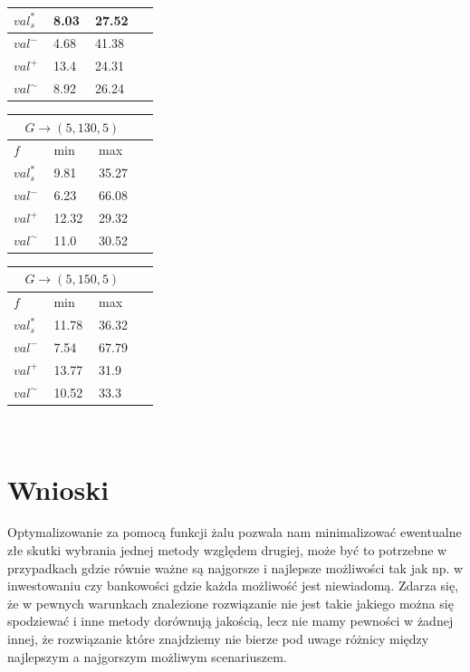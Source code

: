 \documentclass[10pt]{article}
\begin{document}
\begin{center}
\begin{tabular}{|C{0.08\linewidth}|C{0.08\linewidth}|C{0.08\linewidth}|C{0.08\linewidth}|}
    $val^*_s$    & 8.03 & 27.52 \\ \hline
    ${val}^-$    & 4.68 & 41.38 \\ \hline
    ${val}^+$    & 13.4 & 24.31 \\ \hline
    ${val}^\sim$ & 8.92 & 26.24 \\ \hline
  \end{tabular}
  \begin{tabular}{|C{0.08\linewidth}|C{0.08\linewidth}|C{0.08\linewidth}|C{0.08\linewidth}|}
    \hline
     \\ \hline
    $f$          & min  & max  \\ \hline
    $val^*_s$    & 9.81 & 35.27 \\ \hline
    ${val}^-$    & 6.23 & 66.08 \\ \hline
    ${val}^+$    & 12.32 & 29.32 \\ \hline
    ${val}^\sim$ & 11.0 & 30.52 \\ \hline
  \end{tabular}
  \begin{tabular}{|C{0.08\linewidth}|C{0.08\linewidth}|C{0.08\linewidth}|C{0.08\linewidth}|}
    \hline
     \\ \hline
    $f$          & min  & max  \\ \hline
    $val^*_s$    & 11.78 & 36.32  \\ \hline
    ${val}^-$    & 7.54 & 67.79 \\ \hline
    ${val}^+$    & 13.77 & 31.9  \\ \hline
    ${val}^\sim$ & 10.52 & 33.3  \\ \hline
  \end{tabular}
  \\\label{tab:some}
\end{center}

\section{Wnioski}
Optymalizowanie za pomocą funkcji żalu pozwala nam minimalizować ewentualne złe skutki wybrania jednej metody względem drugiej, może być to potrzebne w przypadkach gdzie równie ważne są najgorsze i najlepsze możliwości tak jak np. w inwestowaniu czy bankowości gdzie każda możliwość jest niewiadomą. Zdarza się, że w pewnych warunkach znalezione rozwiązanie nie jest takie jakiego można się spodziewać i inne metody dorównują jakością, lecz nie mamy pewności w żadnej innej, że rozwiązanie które znajdziemy nie bierze pod uwage różnicy między najlepszym a najgorszym możliwym scenariuszem.
\end{document}
